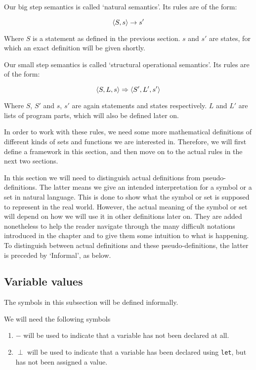 Our big step semantics is called `natural semantics'. Its rules are of the form: 

$$\langle S, s \rangle \to s'$$

Where $S$ is a statement as defined in the previous section. $s$ and $s'$ are states, for which an exact definition will be given shortly. 

Our small step semantics is called `structural operational semantics'. Its rules are of the form:

$$\langle S, L, s \rangle \Rightarrow \langle S', L', s' \rangle$$

Where $S$, $S'$ and $s$, $s'$ are again statements and states respectively. $L$ and $L'$ are lists of program parts, which will also be defined later on. 

In order to work with these rules, we need some more mathematical definitions of different kinds of sets and functions we are interested in. Therefore, we will first define a framework in this section, and then move on to the actual rules in the next two sections. 

In this section we will need to distinguish actual definitions from pseudo-definitions. The latter means we give an intended interpretation for a symbol or a set in natural language. This is done to show what the symbol or set is supposed to represent in the real world. However, the actual meaning of the symbol or set will depend on how we will use it in other definitions later on. They are added nonetheless to help the reader navigate through the many difficult notations introduced in the chapter and to give them some intuition to what is happening. To distinguish between actual definitions and these pseudo-definitions, the latter is preceded by `Informal', as below. 

\subsection*{Variable values}
The symbols in this subsection will be defined informally.  

\begin{infdefinition}
We will need the following symbols 
\begin{enumerate}[noitemsep, label={\roman*)}]
    \item $-$ will be used to indicate that a variable has not been declared at all.
    \item $\perp$ will be used to indicate that a variable has been declared using \verb|let|, but has not been assigned a value.
\end{enumerate}
\end{infdefinition}

